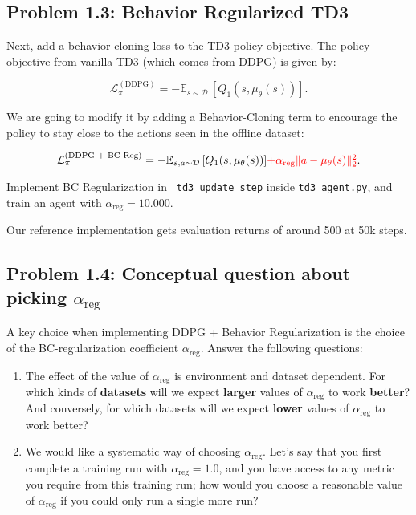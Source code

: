 \documentclass[12pt]{article}
\begin{document}
\begin{solution}[height=5cm]
\end{solution}


\subsection*{Problem 1.3: Behavior Regularized TD3}

Next, add a behavior-cloning loss to the TD3 policy objective. The policy objective from vanilla TD3 (which comes from DDPG) is given by:

\begin{equation}
\textstyle \mathcal{L}_\pi^{(\text{DDPG})} = -\mathbb{E}_{s\sim\mathcal{D}}\,[Q_1(s, \mu_\theta(s))].
\end{equation}

We are going to modify it by adding a Behavior-Cloning term to encourage the policy to stay close to the actions seen in the offline dataset:

\begin{equation}
\textstyle \mathcal{L}_\pi^{(\text{DDPG + BC-Reg})} = -\mathbb{E}_{s, a \sim \mathcal{D}}\,[Q_1(s, \mu_\theta(s))] \textcolor{red}{ + \alpha_\text{reg} \|a - \mu_\theta(s)\|_2^2}.
\end{equation}


Implement BC Regularization in \texttt{_td3_update_step} inside \texttt{td3_agent.py}, and train an agent with $\alpha_\text{reg} = 10.000$.

Our reference implementation gets evaluation returns of around 500 at 50k steps.

\begin{solution}[height=5cm]
\end{solution}

\subsection*{Problem 1.4: Conceptual question about picking $\alpha_\text{reg}$}
A key choice when implementing DDPG + Behavior Regularization is the choice of the BC-regularization coefficient $\alpha_\text{reg}$. Answer the following questions:

\begin{enumerate}
    \item The effect of the value of $\alpha_\text{reg}$ is environment and dataset dependent. For which kinds of \textbf{datasets} will we expect \textbf{larger} values of $\alpha_\text{reg}$ to work \textbf{better}? And conversely, for which datasets will we expect \textbf{lower} values of $\alpha_\text{reg}$ to work better?
    \item We would like a systematic way of choosing $\alpha_\text{reg}$. Let's say that you first complete a training run with $\alpha_\text{reg} = 1.0$, and you have access to any metric you require from this training run; how would you choose a reasonable value of $\alpha_\text{reg}$ if you could only run a single more run?
\end{enumerate}
\end{document}
